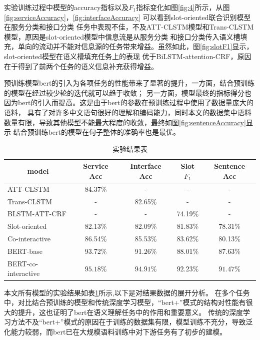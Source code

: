   实验训练过程中模型的accuracy指标以及$F_1$指标变化如图\ref{fig:4}所示，从图\ref{fig:serviceAccuracy}，\ref{fig:interfaceAccuracy}
  可以看到slot-oriented联合识别模型在服务分类和接口分类
  任务中表现不佳，不及ATT-CLSTM模型和Trans-CLSTM模型，原因是slot-oriented模型中信息流是从服务分类
  和接口分类传入语义槽填充，单向的流动并不能对信息源的任务带来增益。虽然如此，图\ref{fig:slotF1}显示，slot-oriented模型在语义槽填充任务上的表现
  优于BiLSTM-attention-CRF，原因在于得到了前两个任务的语义信息补充获得增益。

  预训练模型bert的引入为各项任务的性能带来了显著的提升，一方面，结合预训练的模型在经过较少轮的迭代就可以趋于收敛；
  另一方面，模型最终的指标得分也因为bert的引入而提高。这是由于bert的参数在预训练过程中使用了数据量庞大的语料，
  具有了对许多中文语句很好的理解和编码能力，同时本文的数据集中语料数量有限，导致其他模型不能最大程度的收敛，最终如图\ref{fig:sentenceAccuracy}显示
  结合预训练bert的模型在句子整体的准确率也是最优。

  \begin{table}[htb]
    \centering
    \caption{实验结果表}
    \label{tab:jieguo}
\begin{tabular}{l|cccc}
  \toprule
  \multicolumn{1}{c|}{\centering model}&Service Acc&Interface Acc&Slot $F_1$&Sentence Acc\\
   \hline
   ATT-CLSTM&84.37\%&-&-&-\\
   Trans-CLSTM&-&82.65\%&-&-\\
   BLSTM-ATT-CRF&-&-&74.19\%&-\\
   Slot-oriented&82.13\%&82.09\%&81.83\%&78.31\%\\
   Co-interactive&86.54\%&85.53\%&83.62\%&80.13\%\\
   BERT-base&93.72\%&91.26\%&88.01\%&87.63\%\\
   BERT-co-interactive&$\mathbf{95.18\%}$&$\mathbf{94.91}\%$&$\mathbf{92.23}\%$&$\mathbf{91.47}\%$\\
  \bottomrule
  \end{tabular}
\end{table}

本文所有模型的实验结果如表\ref{tab:jieguo}所示,以下是对结果数据的展开分析。
在多个任务中，对比结合预训练的模型和传统深度学习模型，“bert+”模式的结构对性能有很大的提升，这也证明了bert在语义理解任务中的作用和重要意义。
传统的深度学习方法不及“bert+”模式的原因在于训练的数据集有限，模型训练不充分，导致泛化能力较弱，而bert已在大规模语料训练中对下游任务有了初步的建模。

